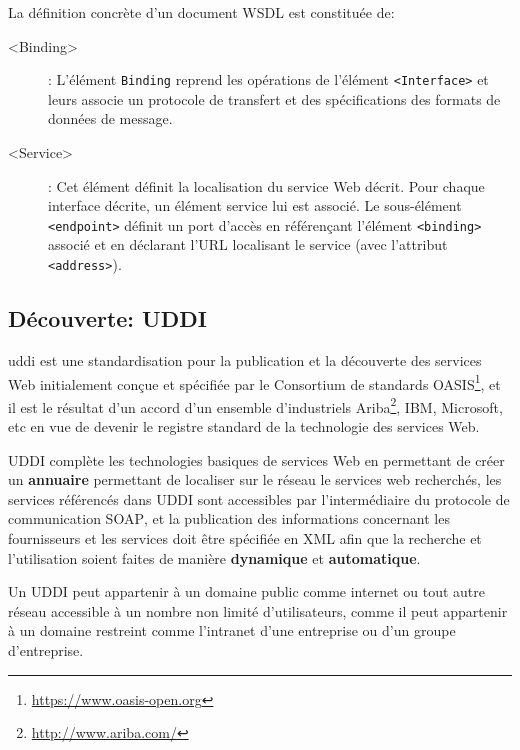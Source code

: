   La définition concrète d'un document \textsc{WSDL} est constituée
  de:

  \SpecialItem
  \renewcommand{\descriptionlabel}[1]{\hspace{1.5cm}\texttt{#1}}
  \begin{description}
  \item[<Binding>]: L'élément \texttt{Binding} reprend les opérations
    de l'élément \texttt{<Interface>} et leurs associe un protocole de
    transfert et des spécifications des formats de données de message.

  \item[<Service>]: Cet élément définit la localisation du service Web
    décrit. Pour chaque interface décrite, un élément service lui est
    associé. Le sous-élément \texttt{<endpoint>} définit un port
    d’accès en référençant l'élément \texttt{<binding>} associé et en
    déclarant l'\textsc{URL} localisant le service (avec l'attribut
    \texttt{<address>}).
  \end{description}
  \newpage
  \subsection{Découverte: UDDI}
  \label{sec:uddi}
  \acrshort{uddi} \cite{clement2004uddi} est une standardisation pour
  la publication et la découverte des services Web initialement conçue
  et spécifiée par le Consortium de standards
  OASIS\footnote{\url{https://www.oasis-open.org}}, et il est le
  résultat d'un accord d'un ensemble d’industriels
  Ariba\footnote{\url{http://www.ariba.com/}}, IBM, Microsoft, etc en
  vue de devenir le registre standard de la technologie des services
  Web.

  \textsc{UDDI} complète les technologies basiques de services Web en
  permettant de créer un \textbf{annuaire} permettant de localiser sur
  le réseau le services web recherchés, les services référencés dans
  \textsc{UDDI} sont accessibles par l'intermédiaire du protocole de
  communication \textsc{SOAP}, et la publication des informations
  concernant les fournisseurs et les services doit être spécifiée en
  \textsc{XML} afin que la recherche et l'utilisation soient faites de
  manière \textbf{dynamique} et \textbf{automatique}.

  Un \textsc{UDDI} peut appartenir à un domaine public comme internet
  ou tout autre réseau accessible à un nombre non limité
  d'utilisateurs, comme il peut appartenir à un domaine restreint
  comme l'intranet d’une entreprise ou d'un groupe d'entreprise.

